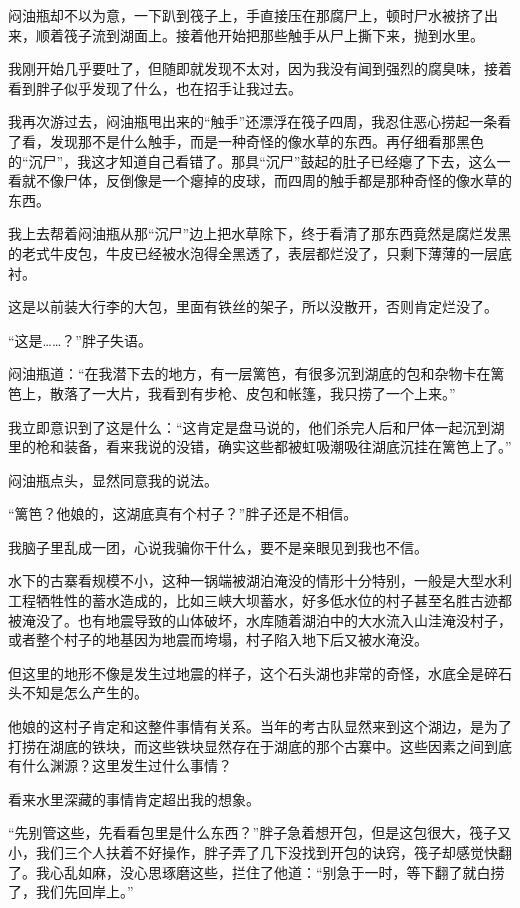 闷油瓶却不以为意，一下趴到筏子上，手直接压在那腐尸上，顿时尸水被挤了出来，顺着筏子流到湖面上。接着他开始把那些触手从尸上撕下来，抛到水里。

我刚开始几乎要吐了，但随即就发现不太对，因为我没有闻到强烈的腐臭味，接着看到胖子似乎发现了什么，也在招手让我过去。

我再次游过去，闷油瓶甩出来的“触手”还漂浮在筏子四周，我忍住恶心捞起一条看了看，发现那不是什么触手，而是一种奇怪的像水草的东西。再仔细看那黑色的“沉尸”，我这才知道自己看错了。那具“沉尸”鼓起的肚子已经瘪了下去，这么一看就不像尸体，反倒像是一个瘪掉的皮球，而四周的触手都是那种奇怪的像水草的东西。

我上去帮着闷油瓶从那“沉尸”边上把水草除下，终于看清了那东西竟然是腐烂发黑的老式牛皮包，牛皮已经被水泡得全黑透了，表层都烂没了，只剩下薄薄的一层底衬。

这是以前装大行李的大包，里面有铁丝的架子，所以没散开，否则肯定烂没了。

“这是……？”胖子失语。

闷油瓶道：“在我潜下去的地方，有一层篱笆，有很多沉到湖底的包和杂物卡在篱笆上，散落了一大片，我看到有步枪、皮包和帐篷，我只捞了一个上来。”

我立即意识到了这是什么：“这肯定是盘马说的，他们杀完人后和尸体一起沉到湖里的枪和装备，看来我说的没错，确实这些都被虹吸潮吸往湖底沉挂在篱笆上了。”

闷油瓶点头，显然同意我的说法。

“篱笆？他娘的，这湖底真有个村子？”胖子还是不相信。

我脑子里乱成一团，心说我骗你干什么，要不是亲眼见到我也不信。

水下的古寨看规模不小，这种一锅端被湖泊淹没的情形十分特别，一般是大型水利工程牺牲性的蓄水造成的，比如三峡大坝蓄水，好多低水位的村子甚至名胜古迹都被淹没了。也有地震导致的山体破坏，水库随着湖泊中的大水流入山洼淹没村子，或者整个村子的地基因为地震而垮塌，村子陷入地下后又被水淹没。

但这里的地形不像是发生过地震的样子，这个石头湖也非常的奇怪，水底全是碎石头不知是怎么产生的。

他娘的这村子肯定和这整件事情有关系。当年的考古队显然来到这个湖边，是为了打捞在湖底的铁块，而这些铁块显然存在于湖底的那个古寨中。这些因素之间到底有什么渊源？这里发生过什么事情？

看来水里深藏的事情肯定超出我的想象。

“先别管这些，先看看包里是什么东西？”胖子急着想开包，但是这包很大，筏子又小，我们三个人扶着不好操作，胖子弄了几下没找到开包的诀窍，筏子却感觉快翻了。我心乱如麻，没心思琢磨这些，拦住了他道：“别急于一时，等下翻了就白捞了，我们先回岸上。”

